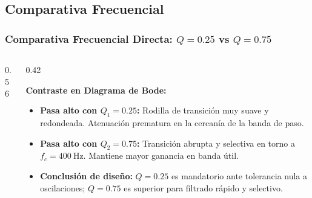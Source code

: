 \subsection{Comparativa Frecuencial}
\begin{frame}
  \frametitle{Comparativa Frecuencial Directa: $Q = 0.25$ vs $Q = 0.75$}

  \begin{columns}[c, onlytextwidth]
    \begin{column}{0.56\textwidth}
      \centering
    \end{column}

    \begin{column}{0.42\textwidth}
      \begin{tarjeta}
        {\fontsize{8.5pt}{10.5pt}\selectfont \textbf{\color{NavyDark} Contraste en Diagrama de Bode:}}\\[2pt]
        {\fontsize{7.5pt}{9.2pt}\selectfont
        \begin{itemize}\setlength{\itemsep}{2pt}
          \item \textbf{Pasa alto con $Q_1 = 0.25$:}
          Rodilla de transición muy suave y redondeada. Atenuación prematura en la cercanía de la banda de paso.
          \item \textbf{Pasa alto con $Q_2 = 0.75$:}
          Transición abrupta y selectiva en torno a $f_c = \qty{400}{\hertz}$. Mantiene mayor ganancia en banda útil.
          \item \textbf{Conclusión de diseño:}
          $Q=0.25$ es mandatorio ante tolerancia nula a oscilaciones; $Q=0.75$ es superior para filtrado rápido y selectivo.
        \end{itemize}
        }
      \end{tarjeta}
    \end{column}
  \end{columns}
\end{frame}
